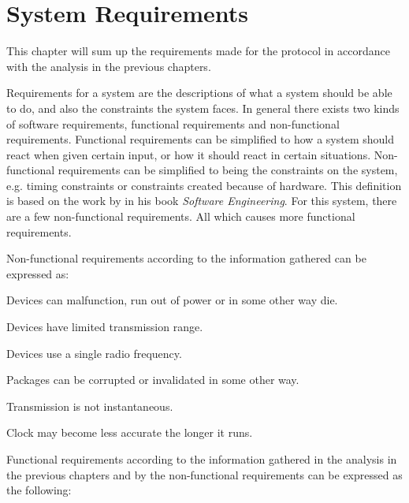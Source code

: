 \chapter{System Requirements}\label{requirements}
This chapter will sum up the requirements made for the protocol in accordance with the analysis in the previous chapters.

Requirements for a system are the descriptions of what a system should be able to do, and also the constraints the system faces.
In general there exists two kinds of software requirements, functional requirements and non-functional requirements. 
Functional requirements can be simplified to how a system should react when given certain input, or how it should react in certain situations.
Non-functional requirements can be simplified to being the constraints on the system, e.g. timing constraints or constraints created because of hardware.
This definition is based on the work by \citet[see][chapter 4]{SEBook} in his book \textit{Software Engineering}.
For this system, there are a few non-functional requirements. All which causes more functional requirements.

\bigskip \noindent
Non-functional requirements according to the information gathered can be expressed as:
\begin{enumberate}
    \item Devices can malfunction, run out of power or in some other way die.
    \item Devices have limited transmission range.
    \item Devices use a single radio frequency.
    \item Packages can be corrupted or invalidated in some other way.
    \item Transmission is not instantaneous.
    \item Clock may become less accurate the longer it runs.
\end{enumberate}
\noindent
Functional requirements according to the information gathered in the analysis in the previous chapters and by the non-functional requirements can be expressed as the following: 

